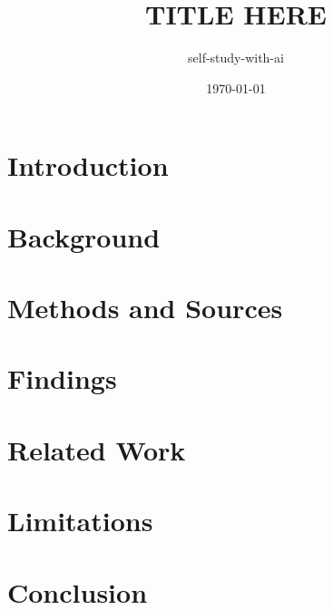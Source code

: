 \documentclass{article}
\title{TITLE HERE}
\author{self-study-with-ai}
\date{\today}
\begin{document}
\maketitle

\begin{abstract}
\end{abstract}

\section{Introduction}

\section{Background}

\section{Methods and Sources}

\section{Findings}

\section{Related Work}

\section{Limitations}

\section{Conclusion}



\end{document}
